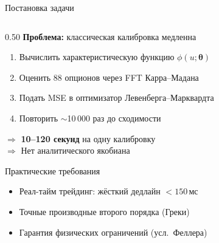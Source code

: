 \documentclass[aspectratio=169, 10pt]{beamer}
\begin{document}
\begin{frame}{Постановка задачи}
  \begin{columns}[T]

    \begin{column}{0.50\textwidth}
      \textbf{Проблема:} классическая калибровка медленна\\[0.5em]
      \begin{enumerate}\small
        \item Вычислить характеристическую функцию $\phi(u;\boldsymbol\theta)$
        \item Оценить 88 опционов через FFT Карра--Мадана
        \item Подать MSE в оптимизатор Левенберга--Марквардта
        \item Повторить $\sim$10\,000 раз до сходимости
      \end{enumerate}
      \vspace{0.5em}
      \alert{$\Rightarrow$ \textbf{10–120 секунд} на одну калибровку}\\[0.3em]
      \alert{$\Rightarrow$ Нет аналитического якобиана}\\[0.5em]

      \begin{block}{Практические требования}
        \small
        \begin{itemize}
          \item[\faCheck] Реал-тайм трейдинг: жёсткий дедлайн $< 150$\,мс
          \item[\faCheck] Точные производные второго порядка (Греки)
          \item[\faCheck] Гарантия физических ограничений (усл.\ Феллера)
        \end{itemize}
      \end{block}
    \end{column}


\end{columns}
\end{frame}
\end{document}
